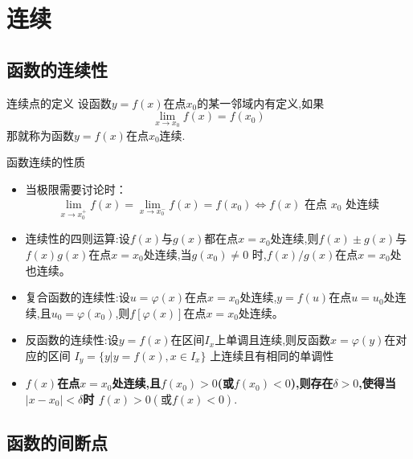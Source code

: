 \documentclass[8pt a4paper, oneside, UTF8]{ctexbook}
\begin{document}
\begin{sloppypar}
    \else
    \fi
    \chapter{连续}
    \section{函数的连续性}
    \begin{defn}{连续点的定义}{}
        设函数$y=f(x)$在点$x_0$的某一邻域内有定义,如果
        $$
            \lim_{x\to x_0}f(x)=f(x_0)
        $$
        那就称为函数$y=f(x)$在点$x_0$连续.
    \end{defn}
    \begin{criterion}{函数连续的性质}{}
        \begin{itemize}
            \item 当极限需要讨论时：
            $$
            \lim_{x\to x_0^+}f\left(x\right)=\lim_{x\to x_0^-}f\left(x\right)=f\left(x_0\right)\Leftrightarrow f\left(x\right)\text{ 在点 }x_0\text{ 处连续}
            $$
            \item 连续性的四则运算:设$f(x)$与$g(x)$都在点$x=x_0$处连续,则$f(x)\pm g(x)$与$f(x)g(x)$在点$x=x_{0}$处连续,当$g(x_0)\neq0$ 时,$f(x)/g(x)$在点$x=x_{0}$处也连续。
            \item 复合函数的连续性:设$u=\varphi(x)$在点$x=x_0$处连续,$y=f(u)$在点$u=u_0$处连续,且$u_{0}=\varphi(x_{0})$,则$f\left[\varphi(x)\right]$在点$x=x_{0}$处连续。
            \item 反函数的连续性:设$y=f(x)$在区间$I_x$上单调且连续,则反函数$x=\varphi(y)$在对应的区间 $I_{y}=\{y|y=f(x),x\in I_{x}\}$ 上连续且有相同的单调性
            \item \textbf{$f(x)$在点$x=x_0$处连续,且$f(x_0)>0$(或$f(x_0)<0$),则存在$\delta>0$,使得当$|x-x_0|<\delta$时 $f\left(x\right)>0\left(\text{或}f\left(x\right)<0\right).$ }
        \end{itemize}
    \end{criterion}
    \section{函数的间断点}

\end{sloppypar}
\end{document}
